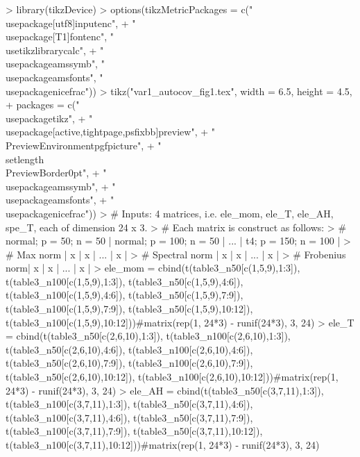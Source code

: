 \documentclass{article}
\begin{document}
\begin{Schunk}
\begin{Sinput}
> library(tikzDevice)
> options(tikzMetricPackages = c("\\usepackage[utf8]{inputenc}",
+     "\\usepackage[T1]{fontenc}", "\\usetikzlibrary{calc}",
+     "\\usepackage{amssymb}", "\\usepackage{amsfonts}", "\\usepackage{nicefrac}"))
> tikz("var1_autocov_fig1.tex", width = 6.5, height = 4.5,
+      packages = c("\\usepackage{tikz}",
+                  "\\usepackage[active,tightpage,psfixbb]{preview}",
+                  "\\PreviewEnvironment{pgfpicture}",
+                  "\\setlength\\PreviewBorder{0pt}",
+                  "\\usepackage{amssymb}",
+                  "\\usepackage{amsfonts}",
+                  "\\usepackage{nicefrac}"))
> # Inputs: 4 matrices, i.e. ele_mom, ele_T, ele_AH, spe_T, each of dimension 24 x 3.
> # Each matrix is construct as follows:
> #                normal; p = 50; n = 50 | normal; p = 100; n = 50 | ... | t4; p = 150; n = 100 |
> # Max norm      |            x          |         x               | ... |         x            |
> # Spectral norm |            x          |         x               | ... |         x            |
> # Frobenius norm|            x          |         x               | ... |         x            |
> ele_mom = cbind(t(table3_n50[c(1,5,9),1:3]), t(table3_n100[c(1,5,9),1:3]), t(table3_n50[c(1,5,9),4:6]), t(table3_n100[c(1,5,9),4:6]), t(table3_n50[c(1,5,9),7:9]), t(table3_n100[c(1,5,9),7:9]), t(table3_n50[c(1,5,9),10:12]), t(table3_n100[c(1,5,9),10:12]))#matrix(rep(1, 24*3) - runif(24*3), 3, 24)
> ele_T = cbind(t(table3_n50[c(2,6,10),1:3]), t(table3_n100[c(2,6,10),1:3]), t(table3_n50[c(2,6,10),4:6]), t(table3_n100[c(2,6,10),4:6]), t(table3_n50[c(2,6,10),7:9]), t(table3_n100[c(2,6,10),7:9]), t(table3_n50[c(2,6,10),10:12]), t(table3_n100[c(2,6,10),10:12]))#matrix(rep(1, 24*3) - runif(24*3), 3, 24)
> ele_AH = cbind(t(table3_n50[c(3,7,11),1:3]), t(table3_n100[c(3,7,11),1:3]), t(table3_n50[c(3,7,11),4:6]), t(table3_n100[c(3,7,11),4:6]), t(table3_n50[c(3,7,11),7:9]), t(table3_n100[c(3,7,11),7:9]), t(table3_n50[c(3,7,11),10:12]), t(table3_n100[c(3,7,11),10:12]))#matrix(rep(1, 24*3) - runif(24*3), 3, 24)

\end{Sinput}
\end{Schunk}
\end{document}
